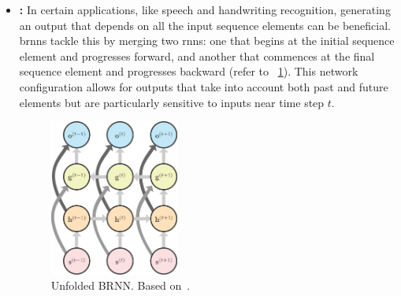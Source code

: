 \begin{itemize}
    \item \textbf{\cite{schuster1997bidirectional}:} In certain applications, like speech and handwriting recognition, generating an output that depends on all the input sequence elements can be beneficial. \glspl{brnn} tackle this by merging two \glspl{rnn}: one that begins at the initial sequence element and progresses forward, and another that commences at the final sequence element and progresses backward (refer to \fig~\ref{fig:brnn}). This network configuration allows for outputs that take into account both past and future elements but are particularly sensitive to inputs near time step $t$.

    \begin{figure}[!ht]
    \begin{center}
    \includegraphics[width=0.40\textwidth]{Figures/Background/brnn.pdf}
    \caption{Unfolded BRNN. Based on~\cite{goodfellow2016deep}.}
    \label{fig:brnn}
    \end{center}
    \end{figure}


\end{itemize}
